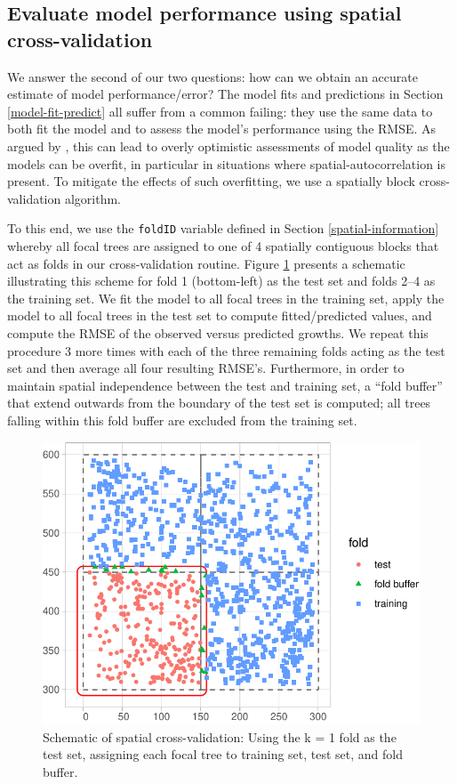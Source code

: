\documentclass[12pt]{article}
\begin{document}
\hypertarget{spatial-cross-validation}{%
\subsection{Evaluate model performance using spatial
cross-validation}\label{spatial-cross-validation}}

We answer the second of our two questions: how can we obtain an accurate
estimate of model performance/error? The model fits and predictions in
Section \ref{model-fit-predict} all suffer from a common failing: they
use the same data to both fit the model and to assess the model's
performance using the RMSE. As argued by
\citet{roberts_cross-validation_2017}, this can lead to overly
optimistic assessments of model quality as the models can be overfit, in
particular in situations where spatial-autocorrelation is present. To
mitigate the effects of such overfitting, we use a spatially block
cross-validation algorithm.

To this end, we use the \texttt{foldID} variable defined in Section
\ref{spatial-information} whereby all focal trees are assigned to one of
4 spatially contiguous blocks that act as folds in our cross-validation
routine. Figure \ref{fig:scbi-spatial-cross-validation-schematic}
presents a schematic illustrating this scheme for fold 1 (bottom-left)
as the test set and folds 2--4 as the training set. We fit the model to
all focal trees in the training set, apply the model to all focal trees
in the test set to compute fitted/predicted values, and compute the RMSE
of the observed versus predicted growths. We repeat this procedure 3
more times with each of the three remaining folds acting as the test set
and then average all four resulting RMSE's. Furthermore, in order to
maintain spatial independence between the test and training set, a
``fold buffer'' that extend outwards from the boundary of the test set
is computed; all trees falling within this fold buffer are excluded from
the training set.

\begin{figure}

{\centering \includegraphics[width=0.66\linewidth]{Figures/scbi-spatial-cross-validation-schematic-1} 

}

\caption{Schematic of spatial cross-validation: Using the k = 1 fold as the test set, assigning each focal tree to training set, test set, and fold buffer.}\label{fig:scbi-spatial-cross-validation-schematic}
\end{figure}
\end{document}
